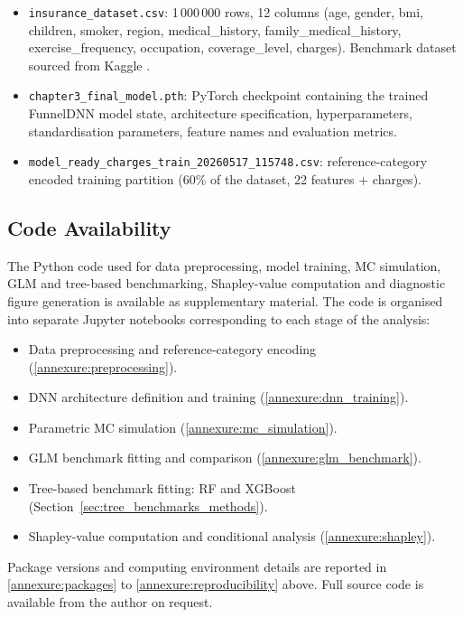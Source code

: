 \begin{itemize}
    \item \texttt{insurance\_\allowbreak{}dataset.csv}: 1\,000\,000 rows, 12 columns (age, gender, bmi, children, smoker, region, medical\_history, family\_medical\_history, exercise\_frequency, occupation, coverage\_level, charges). Benchmark dataset sourced from Kaggle \citep{kaggleInsuranceDataML}.

    \item \texttt{chapter3\_final\_\allowbreak{}model.pth}: PyTorch checkpoint containing the trained FunnelDNN model state, architecture specification, hyperparameters, standardisation parameters, feature names and evaluation metrics.

    \item \texttt{model\_ready\_charges\_\allowbreak{}train\_\allowbreak{}20260517\_115748.csv}: reference-category encoded training partition (60\% of the dataset, 22 features + charges).
\end{itemize}

\subsection{Code Availability}
\label{annexure:code_availability}

The Python code used for data preprocessing, model training, MC simulation, GLM and tree-based benchmarking, Shapley-value computation and diagnostic figure generation is available as supplementary material. The code is organised into separate Jupyter notebooks corresponding to each stage of the analysis:

\begin{itemize}
    \item Data preprocessing and reference-category encoding (\ref{annexure:preprocessing}).
    \item DNN architecture definition and training (\ref{annexure:dnn_training}).
    \item Parametric MC simulation (\ref{annexure:mc_simulation}).
    \item GLM benchmark fitting and comparison (\ref{annexure:glm_benchmark}).
    \item Tree-based benchmark fitting: RF and XGBoost (Section~\ref{sec:tree_benchmarks_methods}).
    \item Shapley-value computation and conditional analysis (\ref{annexure:shapley}).
\end{itemize}

Package versions and computing environment details are reported in \ref{annexure:packages} to \ref{annexure:reproducibility} above. Full source code is available from the author on request.

